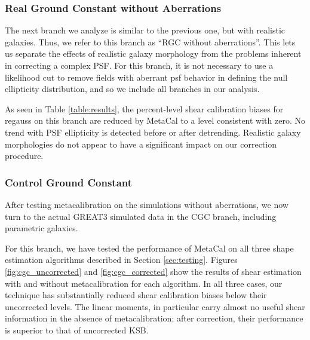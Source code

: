 \documentclass[iop]{emulateapj}
\begin{document}
\subsubsection{Real Ground Constant without Aberrations}

The next branch we analyze is similar to the previous one, but with
realistic galaxies.  Thus, we refer to this branch as ``RGC without
aberrations''. This lets us separate the effects of realistic galaxy
morphology from the problems inherent in correcting a complex PSF. For
this branch, it is not necessary to use a likelihood cut to remove
fields with aberrant psf behavior in defining the null ellipticity
distribution, and so we include all branches in our analysis.

As seen in Table \ref{table:results}, the percent-level shear
calibration biases for regauss on this branch are reduced by MetaCal
to a level consistent with zero. No trend with PSF ellipticity is
detected before or after detrending. Realistic galaxy morphologies do
not appear to have a significant impact on our correction procedure.


\subsubsection{Control Ground Constant}

After testing metacalibration on the simulations without aberrations,
we now turn to the actual GREAT3 simulated data in the CGC branch,
including parametric galaxies.

For this branch, we have tested the performance of MetaCal on all
three shape estimation algorithms described in Section
\ref{sec:testing}. Figures \ref{fig:cgc_uncorrected} and \ref{fig:cgc_corrected}
show the results of shear estimation with
and without metacalibration for each algorithm. In all three cases,
our technique has substantially reduced shear calibration biases below
their uncorrected levels. The linear moments, in particular carry
almost no useful shear information in the absence of metacalibration;
after correction, their performance is superior to that of uncorrected
KSB.
\end{document}
